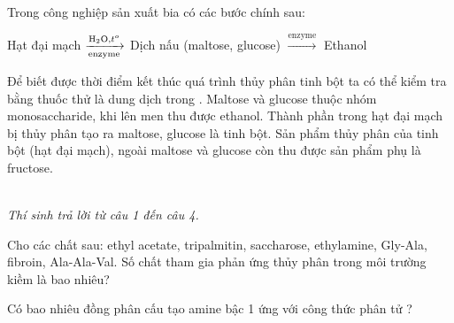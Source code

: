 \documentclass[11pt,a4paper]{article}
\begin{document}
\begin{ex}
Trong công nghiệp sản xuất bia có các bước chính sau:\\
\centerline{Hạt đại mạch $\xrightarrow[\text{enzyme}]{\ce{H2O}, t^o}$ Dịch nấu (maltose, glucose) $\xrightarrow{\text{enzyme}}$ Ethanol}
\choiceTF
\True Để biết được thời điểm kết thúc quá trình thủy phân tinh bột ta có thể kiểm tra bằng thuốc thử là dung dịch  trong .
Maltose và glucose thuộc nhóm monosaccharide, khi lên men thu được ethanol.
\True Thành phần trong hạt đại mạch bị thủy phân tạo ra maltose, glucose là tinh bột.
Sản phẩm thủy phân của tinh bột (hạt đại mạch), ngoài maltose và glucose còn thu được sản phẩm phụ là fructose.
\end{ex}

\vspace{6pt}
 \\
\textit{Thí sinh trả lời từ câu 1 đến câu 4.}
\vspace{4pt}

\begin{ex}
Cho các chất sau: ethyl acetate, tripalmitin, saccharose, ethylamine, Gly-Ala, fibroin, Ala-Ala-Val. Số chất tham gia phản ứng thủy phân trong môi trường kiềm là bao nhiêu?
\end{ex}

\begin{ex}
Có bao nhiêu đồng phân cấu tạo amine bậc 1 ứng với công thức phân tử ?
\end{ex}
\end{document}
